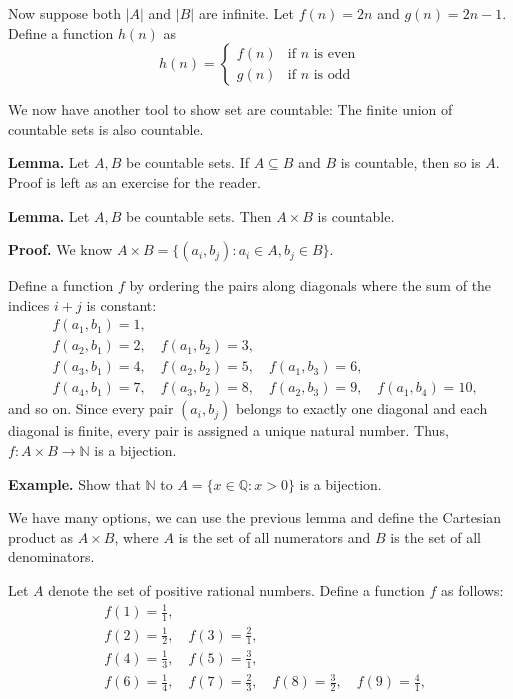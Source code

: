 \documentclass{article}
\begin{document}
    Now suppose both $|A|$ and $|B|$ are infinite. Let $f(n) = 2n$ and $g(n) = 2n - 1$.
    Define a function $h(n)$ as 
    $$h(n) = 
    \begin{cases}
        f(n) & \text{if $n$ is even} \\
        g(n) & \text{if $n$ is odd}
    \end{cases}$$
    
    We now have another tool to show set are countable: The finite union of countable sets is also countable.

    \vspace{3mm}
    \textbf{Lemma.} Let $A, B$ be countable sets. If $A \subseteq B$ and $B$ is countable, then so is $A$. Proof is left as an exercise for the reader.
    
    \vspace{3mm}
    \textbf{Lemma.} Let $A, B$ be countable sets. Then $A \times B$ is countable.
    
    \vspace{1.5mm}
    \textbf{Proof.}
    We know $A \times B = \{(a_{i}, b_{j}) : a_{i} \in A, b_{j} \in B\}$.
    
    Define a function $f$ by ordering the pairs along diagonals where the sum of the indices $i+j$ is constant:
    \begin{align*}
        &f(a_{1}, b_{1}) = 1, \\
        &f(a_{2}, b_{1}) = 2, \quad f(a_{1}, b_{2}) = 3, \\
        &f(a_{3}, b_{1}) = 4, \quad f(a_{2}, b_{2}) = 5, \quad f(a_{1}, b_{3}) = 6, \\
        &f(a_{4}, b_{1}) = 7, \quad f(a_{3}, b_{2}) = 8, \quad f(a_{2}, b_{3}) = 9, \quad f(a_{1}, b_{4}) = 10,
    \end{align*}
    and so on. Since every pair $(a_i, b_j)$ belongs to exactly one diagonal and each diagonal is finite, every pair is assigned a unique natural number. Thus, $f: A \times B \rightarrow \mathbb{N}$ is a bijection.
    
    \vspace{3mm}
    \textbf{Example.} 
    Show that $\mathbb{N}$ to $A = \{x \in \mathbb{Q}: x > 0\}$ is a bijection.
    
    \vspace{1.5mm}
    We have many options, we can use the previous lemma and define the Cartesian product as $A \times B$, where $A$ is the set of all numerators and $B$ is the set of all denominators.
    
    Let $A$ denote the set of positive rational numbers. Define a function $f$ as follows:
    \begin{align*}
        & f(1) = \frac{1}{1}, \\
        & f(2) = \frac{1}{2}, \quad f(3) = \frac{2}{1}, \\
        & f(4) = \frac{1}{3}, \quad f(5) = \frac{3}{1}, \\
        & f(6) = \frac{1}{4}, \quad f(7) = \frac{2}{3}, \quad f(8) = \frac{3}{2}, \quad f(9) = \frac{4}{1},
    \end{align*}
\end{document}
